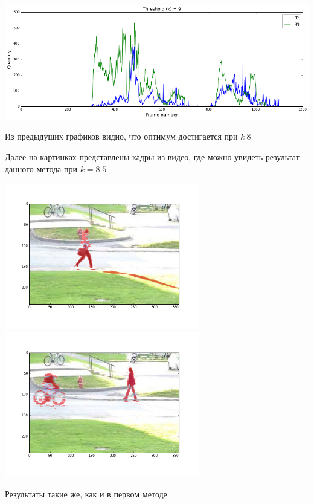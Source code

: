 \documentclass[12pt, a4paper]{article}
\begin{document}
			\begin{center}
				\includegraphics[width=17cm]{2par_k_9.png}
			\end{center}

			Из предыдущих графиков видно, что оптимум достигается при $k ~ 8$

			Далее на картинках представлены кадры из видео, где можно увидеть результат данного метода при $k = 8.5$
			\begin{center}
				\includegraphics[width=8.5cm]{2par_vid_0.png}
				\includegraphics[width=8.5cm]{2par_vid_1.png}
			\end{center}

			Результаты такие же, как и в первом методе
\end{document}
